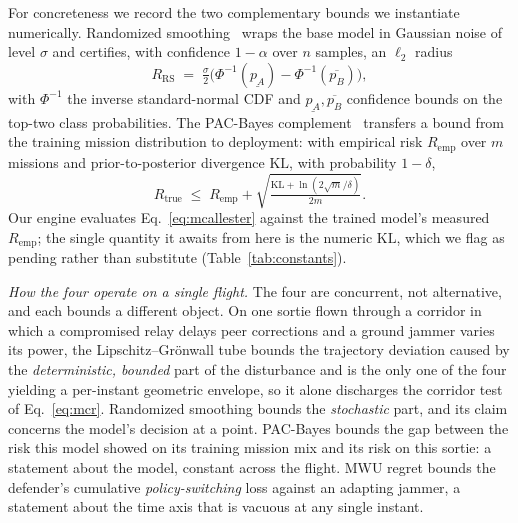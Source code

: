 For concreteness we record the two complementary bounds we instantiate
numerically. Randomized smoothing~\cite{cohen2019smoothing} wraps the base model
in Gaussian noise of level $\sigma$ and certifies, with confidence $1-\alpha$
over $n$ samples, an $\ell_2$ radius
\begin{equation}
\label{eq:cohen}
R_{\mathrm{RS}} \;=\; \tfrac{\sigma}{2}\big(\Phi^{-1}(\underline{p_A})-\Phi^{-1}(\overline{p_B})\big),
\end{equation}
with $\Phi^{-1}$ the inverse standard-normal CDF and
$\underline{p_A},\overline{p_B}$ confidence bounds on the top-two class
probabilities. The PAC-Bayes
complement~\cite{mcallester1999pac,viallard2021pacbayes} transfers a bound from
the training mission distribution to deployment: with empirical risk
$R_{\mathrm{emp}}$ over $m$ missions and prior-to-posterior divergence
$\mathrm{KL}$, with probability $1-\delta$,
\begin{equation}
\label{eq:mcallester}
R_{\mathrm{true}} \;\le\; R_{\mathrm{emp}} + \sqrt{\tfrac{\mathrm{KL}+\ln(2\sqrt{m}/\delta)}{2m}}.
\end{equation}
Our engine evaluates Eq.~\eqref{eq:mcallester} against the trained model's measured
$R_{\mathrm{emp}}$; the single quantity it awaits from here is the numeric $\mathrm{KL}$,
which we flag as pending rather than substitute (Table~\ref{tab:constants}).


\emph{How the four operate on a single flight.} The four are concurrent, not
alternative, and each bounds a different object. On one sortie flown through a
corridor in which a compromised relay delays peer corrections and a ground
jammer varies its power, the Lipschitz--Gr\"onwall tube bounds the trajectory
deviation caused by the \emph{deterministic, bounded} part of the disturbance
and is the only one of the four yielding a per-instant geometric envelope, so it
alone discharges the corridor test of Eq.~\eqref{eq:mcr}. Randomized smoothing
bounds the \emph{stochastic} part, and its claim concerns the model's decision
at a point. PAC-Bayes bounds the gap between the risk this model showed on its
training mission mix and its risk on this sortie: a statement about the model,
constant across the flight. MWU regret bounds the defender's cumulative
\emph{policy-switching} loss against an adapting jammer, a statement about the
time axis that is vacuous at any single instant.

